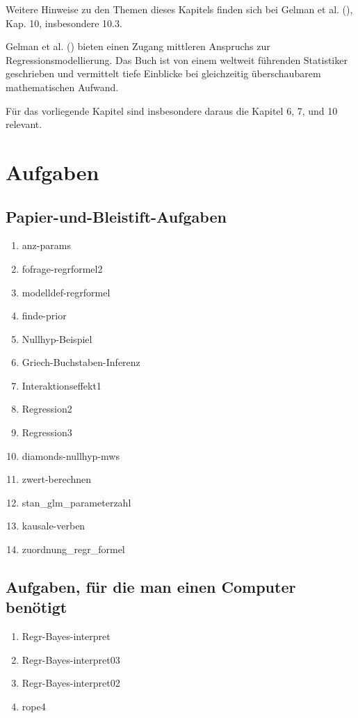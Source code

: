 \documentclass[
  ngerman,
  letterpaper,
  twoside,
  open=any]{scrbook}
\providecommand{\tightlist}{%
  \setlength{\itemsep}{0pt}\setlength{\parskip}{0pt}}\usepackage{longtable,booktabs,array}
\theoremstyle{definition}
\theoremstyle{plain}
\theoremstyle{definition}
\theoremstyle{definition}
\theoremstyle{definition}
\theoremstyle{definition}
\theoremstyle{remark}
\begin{document}
Weitere Hinweise zu den Themen dieses Kapitels finden sich bei Gelman et
al. (), Kap. 10, insbesondere 10.3.

Gelman et al. () bieten einen Zugang
mittleren Anspruchs zur Regressionsmodellierung. Das Buch ist von einem
weltweit führenden Statistiker geschrieben und vermittelt tiefe
Einblicke bei gleichzeitig überschaubarem mathematischen Aufwand.

Für das vorliegende Kapitel sind insbesondere daraus die Kapitel 6, 7,
und 10 relevant.

\section{Aufgaben}\label{aufgaben-10}

\subsection{Papier-und-Bleistift-Aufgaben}\label{papier-und-bleistift-aufgaben-4}

\begin{enumerate}
\def\labelenumi{\arabic{enumi}.}
\tightlist
\item
  anz-params
\item
  fofrage-regrformel2
\item
  modelldef-regrformel
\item
  finde-prior
\item
  Nullhyp-Beispiel
\item
  Griech-Buchstaben-Inferenz
\item
  Interaktionseffekt1
\item
  Regression2
\item
  Regression3
\item
  diamonds-nullhyp-mws
\item
  zwert-berechnen
\item
  stan\_glm\_parameterzahl
\item
  kausale-verben
\item
  zuordnung\_regr\_formel
\end{enumerate}

\subsection{Aufgaben, für die man einen Computer
benötigt}\label{aufgaben-fuxfcr-die-man-einen-computer-benuxf6tigt-1}

\begin{enumerate}
\def\labelenumi{\arabic{enumi}.}
\tightlist
\item
  Regr-Bayes-interpret
\item
  Regr-Bayes-interpret03
\item
  Regr-Bayes-interpret02
\item
  rope4
\end{enumerate}
\end{document}

